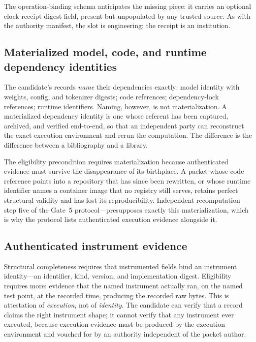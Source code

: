 The operation-binding schema anticipates the missing piece: it carries an optional clock-receipt digest field, present but unpopulated by any trusted source. As with the authority manifest, the slot is engineering; the receipt is an institution.

\subsection{Materialized model, code, and runtime dependency identities}\label{elig:sec:materialized}

The candidate's records \emph{name} their dependencies exactly: model identity with weights, config, and tokenizer digests; code references; dependency-lock references; runtime identifiers. Naming, however, is not materialization. A materialized dependency identity is one whose referent has been captured, archived, and verified end-to-end, so that an independent party can reconstruct the exact execution environment and rerun the computation. The difference is the difference between a bibliography and a library.

The eligibility precondition requires materialization because authenticated evidence must survive the disappearance of its birthplace. A packet whose code reference points into a repository that has since been rewritten, or whose runtime identifier names a container image that no registry still serves, retains perfect structural validity and has lost its reproducibility. Independent recomputation---step five of the Gate~5 protocol---presupposes exactly this materialization, which is why the protocol lists authenticated execution evidence alongside it.

\subsection{Authenticated instrument evidence}\label{elig:sec:instrauth}

Structural completeness requires that instrumented fields bind an instrument identity---an identifier, kind, version, and implementation digest. Eligibility requires more: evidence that the named instrument actually ran, on the named test point, at the recorded time, producing the recorded raw bytes. This is attestation of \emph{execution}, not of \emph{identity}. The candidate can verify that a record claims the right instrument shape; it cannot verify that any instrument ever executed, because execution evidence must be produced by the execution environment and vouched for by an authority independent of the packet author.


